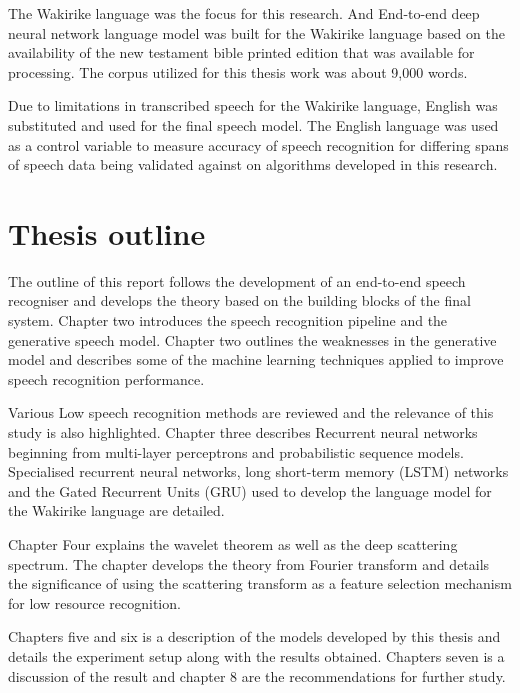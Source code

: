The Wakirike language was the focus for this research.  And End-to-end deep neural network language model was built for the Wakirike language based on the availability of the new testament bible printed edition that was available for processing.  The corpus utilized for this thesis work was about 9,000 words.

Due to limitations in transcribed speech for the Wakirike language, English was substituted and used for the final speech model.  The English language was used as a control variable to measure accuracy of speech recognition for differing spans of speech data being validated against on algorithms developed in this research.

\section{Thesis outline}
The outline of this report follows the development of an end-to-end speech recogniser and develops the theory based on the building blocks of the final system.  Chapter two introduces the speech recognition pipeline and the generative speech model.  Chapter two outlines the weaknesses in the generative model and describes some of the machine learning techniques applied to improve speech recognition performance. 

Various Low speech recognition methods are reviewed and the relevance of this study is also highlighted.  Chapter three describes Recurrent neural networks beginning from multi-layer perceptrons and probabilistic sequence models.  Specialised recurrent neural networks, long short-term memory (LSTM) networks and the Gated Recurrent Units (GRU) used to develop the language model for the Wakirike language are detailed.

Chapter Four explains the wavelet theorem as well as the deep scattering spectrum. The chapter develops the theory from Fourier transform and details the significance of using the scattering transform as a feature selection mechanism for low resource recognition.  

Chapters five and six is a description of the models developed by this thesis and details the experiment setup along with the results obtained. Chapters seven is a discussion of the result and chapter 8 are the recommendations for further study. 


